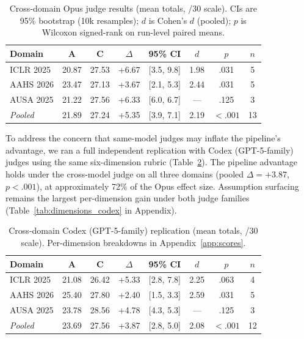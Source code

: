 \documentclass{article}
\begin{document}
\begin{table}[t]
\caption{Cross-domain Opus judge results (mean totals, /30 scale). CIs are 95\% bootstrap (10k resamples); $d$ is Cohen's $d$ (pooled); $p$ is Wilcoxon signed-rank on run-level paired means.}
\label{tab:crossdomain_opus}
\begin{center}
\begin{tabular}{lccccccc}
\toprule
\textbf{Domain} & \textbf{A} & \textbf{C} & \textbf{$\Delta$} & \textbf{95\% CI} & \textbf{$d$} & \textbf{$p$} & \textbf{$n$} \\
\midrule
ICLR 2025 & 20.87 & 27.53 & +6.67 & [3.5, 9.8] & 1.98 & .031 & 5 \\
AAHS 2026 & 23.47 & 27.13 & +3.67 & [2.1, 5.3] & 2.44 & .031 & 5 \\
AUSA 2025 & 21.22 & 27.56 & +6.33 & [6.0, 6.7] & --- & .125 & 3 \\
\midrule
\textit{Pooled} & 21.89 & 27.24 & +5.35 & [3.9, 7.1] & 2.19 & ${<}.001$ & 13 \\
\bottomrule
\end{tabular}
\end{center}
\end{table}

To address the concern that same-model judges may inflate the pipeline's advantage, we ran a full independent replication with Codex (GPT-5-family) judges using the same six-dimension rubric (Table~\ref{tab:crossdomain_codex}). The pipeline advantage holds under the cross-model judge on all three domains (pooled $\Delta{=}+3.87$, $p{<}.001$), at approximately 72\% of the Opus effect size. Assumption surfacing remains the largest per-dimension gain under both judge families (Table~\ref{tab:dimensions_codex} in Appendix).

\begin{table}[t]
\caption{Cross-domain Codex (GPT-5-family) replication (mean totals, /30 scale). Per-dimension breakdowns in Appendix~\ref{app:scores}.}
\label{tab:crossdomain_codex}
\begin{center}
\begin{tabular}{lccccccc}
\toprule
\textbf{Domain} & \textbf{A} & \textbf{C} & \textbf{$\Delta$} & \textbf{95\% CI} & \textbf{$d$} & \textbf{$p$} & \textbf{$n$} \\
\midrule
ICLR 2025 & 21.08 & 26.42 & +5.33 & [2.8, 7.8] & 2.25 & .063 & 4 \\
AAHS 2026 & 25.40 & 27.80 & +2.40 & [1.5, 3.3] & 2.59 & .031 & 5 \\
AUSA 2025 & 23.78 & 28.56 & +4.78 & [4.3, 5.3] & --- & .125 & 3 \\
\midrule
\textit{Pooled} & 23.69 & 27.56 & +3.87 & [2.8, 5.0] & 2.08 & ${<}.001$ & 12 \\
\bottomrule
\end{tabular}
\end{center}
\end{table}
\end{document}
